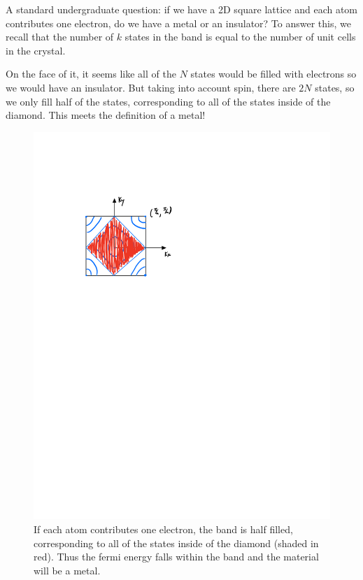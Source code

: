 A standard undergraduate question: if we have a 2D square lattice and each atom contributes one electron, do we have a metal or an insulator? To answer this, we recall that the number of $k$ states in the band is equal to the number of unit cells in the crystal.

On the face of it, it seems like all of the $N$ states would be filled with electrons so we would have an insulator. But taking into account spin, there are $2N$ states, so we only fill half of the states, corresponding to all of the states inside of the diamond. This meets the definition of a metal!

\begin{figure}[htbp]
    \centering
    \includegraphics[scale=0.7]{Images/fig-halffilledsquarelattice.pdf}
    
    \caption{If each atom contributes one electron, the band is half filled, corresponding to all of the states inside of the diamond (shaded in red). Thus the fermi energy falls within the band and the material will be a metal.}
    \label{fig-halffilledsquarelattice}
\end{figure}


